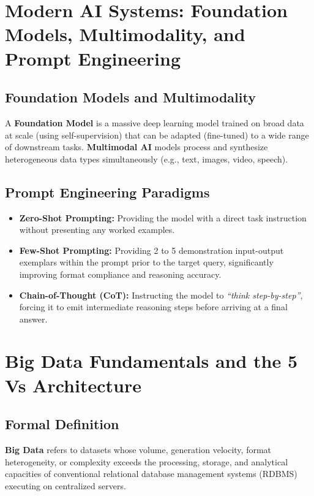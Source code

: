 \section{Modern AI Systems: Foundation Models, Multimodality, and Prompt Engineering}
\label{sec:modern_ai_systems}

\subsection{Foundation Models and Multimodality}
A \textbf{Foundation Model} is a massive deep learning model trained on broad data at scale (using self-supervision) that can be adapted (fine-tuned) to a wide range of downstream tasks. \textbf{Multimodal AI} models process and synthesize heterogeneous data types simultaneously (e.g., text, images, video, speech).

\subsection{Prompt Engineering Paradigms}
\begin{itemize}
    \item \textbf{Zero-Shot Prompting:} Providing the model with a direct task instruction without presenting any worked examples.
    \item \textbf{Few-Shot Prompting:} Providing 2 to 5 demonstration input-output exemplars within the prompt prior to the target query, significantly improving format compliance and reasoning accuracy.
    \item \textbf{Chain-of-Thought (CoT):} Instructing the model to \textit{``think step-by-step''}, forcing it to emit intermediate reasoning steps before arriving at a final answer.
\end{itemize}



\section{Big Data Fundamentals and the 5 Vs Architecture}
\label{sec:big_data_fundamentals}

\subsection{Formal Definition}
\textbf{Big Data} refers to datasets whose volume, generation velocity, format heterogeneity, or complexity exceeds the processing, storage, and analytical capacities of conventional relational database management systems (RDBMS) executing on centralized servers.

